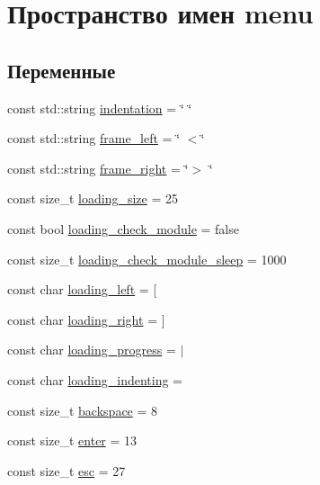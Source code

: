 \hypertarget{namespacemenu}{}\section{Пространство имен menu}
\label{namespacemenu}
\subsection*{Переменные}
\begin{DoxyCompactItemize}
\item 
const std\+::string \hyperlink{namespacemenu_ac0906d6effd5dc68552a724a3edb9330}{indentation} = \char`\"{} \char`\"{}
\item 
const std\+::string \hyperlink{namespacemenu_ab9230afa22bdf260e3944290026a5a86}{frame\+\_\+left} = \char`\"{} $<$\char`\"{}
\item 
const std\+::string \hyperlink{namespacemenu_a3f786c7ab3caec7dfef9e1fa61b52ae7}{frame\+\_\+right} = \char`\"{}$>$ \char`\"{}
\item 
const size\+\_\+t \hyperlink{namespacemenu_aa3bc0d7f62e04dc52dd8f276902448ae}{loading\+\_\+size} = 25
\item 
const bool \hyperlink{namespacemenu_aaea5c70964114a416caa58676ddf8066}{loading\+\_\+check\+\_\+module} = false
\item 
const size\+\_\+t \hyperlink{namespacemenu_a69bce854c4a150920a5c77eede8cab0a}{loading\+\_\+check\+\_\+module\+\_\+sleep} = 1000
\item 
const char \hyperlink{namespacemenu_a56af6a2d586e2b6baa4ebf128a690266}{loading\+\_\+left} = \textquotesingle{}\mbox{[}\textquotesingle{}
\item 
const char \hyperlink{namespacemenu_a272b2c0c591457b2aeccaae0c122a1fc}{loading\+\_\+right} = \textquotesingle{}\mbox{]}\textquotesingle{}
\item 
const char \hyperlink{namespacemenu_ab79f369195d81dcb241b1ab5269c9d3d}{loading\+\_\+progress} = \textquotesingle{}$\vert$\textquotesingle{}
\item 
const char \hyperlink{namespacemenu_ad004c327a8a1c14388a6c7f23d6953a6}{loading\+\_\+indenting} = \textquotesingle{} \textquotesingle{}
\item 
const size\+\_\+t \hyperlink{namespacemenu_af10d26be126a6efaa57428f629514f93}{backspace} = 8
\item 
const size\+\_\+t \hyperlink{namespacemenu_a9ca2724b99053483cb2af7b49563db95}{enter} = 13
\item 
const size\+\_\+t \hyperlink{namespacemenu_a31d13ed09dc59c7220146bd432fc3787}{esc} = 27

\end{DoxyCompactItemize}
